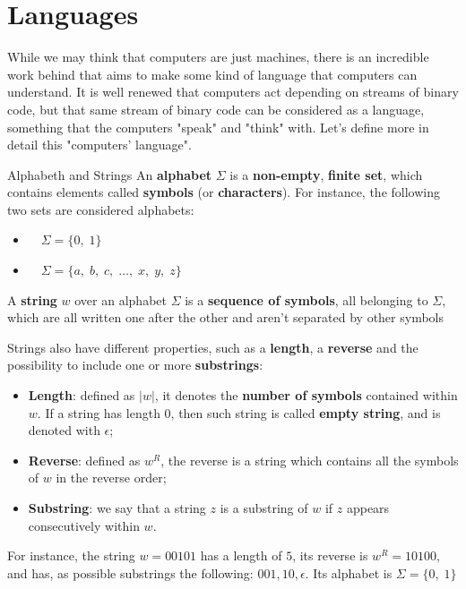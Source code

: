 \chapter{Languages}

While we may think that computers are just machines, there is an incredible work behind that aims to make some kind of language that computers can understand. It is well renewed that computers act depending on streams of binary code, but that same stream of binary code can be considered as a language, something that the computers "speak" and "think" with. Let's define more in detail this "computers' language".

\begin{definition}{Alphabeth and Strings}
    An \textbf{alphabet} $\Sigma$ is a \textbf{non-empty}, \textbf{finite set}, which contains elements called \textbf{symbols} (or \textbf{characters}). For instance, the following two sets are considered alphabets:
    \begin{itemize}
        \item $\quad \Sigma = \{0, \; 1\}$
        \item $\quad \Sigma = \{a, \; b, \; c, \; \dots, \; x, \; y, \; z \}$
    \end{itemize}
    
    \noindent A \textbf{string} $w$ over an alphabet $\Sigma$ is a \textbf{sequence of symbols}, all belonging to $\Sigma$, which are all written one after the other and aren't separated by other symbols
\end{definition}

\noindent Strings also have different properties, such as a \textbf{length}, a \textbf{reverse} and the possibility to include one or more \textbf{substrings}:
\begin{itemize}
    \item \textbf{Length}: defined as $|w|$, it denotes the \textbf{number of symbols} contained within $w$. If a string has length $0$, then such string is called \textbf{empty string}, and is denoted with $\epsilon$;
    \item \textbf{Reverse}: defined as $w^R$, the reverse is a string which contains all the symbols of $w$ in the reverse order;
    \item \textbf{Substring}: we say that a string $z$ is a substring of $w$ if $z$ appears consecutively within $w$.
\end{itemize}

\begin{example}
    For instance, the string $w = 00101$ has a length of $5$, its reverse is $w^R = 10100$, and has, as possible substrings the following: $001, 10, \epsilon$. Its alphabet is $\Sigma = \{0, \; 1\}$
\end{example}

